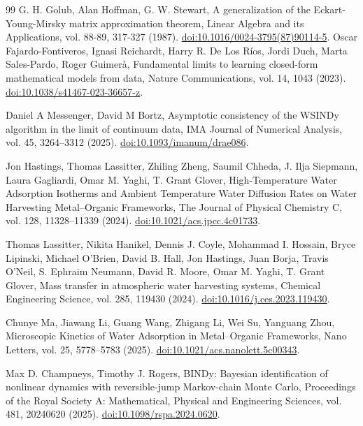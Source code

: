 \documentclass[11pt]{article}
\begin{document}
\begin{thebibliography}{99}
 G. H. Golub, Alan Hoffman, G. W. Stewart, A generalization of the Eckart-Young-Mirsky matrix approximation theorem, Linear Algebra and its Applications, vol. 88-89, 317-327 (1987). \href{https://doi.org/10.1016/0024-3795(87)90114-5}{doi:10.1016/0024-3795(87)90114-5}.
 Oscar Fajardo-Fontiveros, Ignasi Reichardt, Harry R. De Los R\'{i}os, Jordi Duch, Marta Sales-Pardo, Roger Guimer\`{a}, Fundamental limits to learning closed-form mathematical models from data, Nature Communications, vol. 14, 1043 (2023). \href{https://doi.org/10.1038/s41467-023-36657-z}{doi:10.1038/s41467-023-36657-z}.

 Daniel A Messenger, David M Bortz, Asymptotic consistency of the WSINDy algorithm in the limit of continuum data, IMA Journal of Numerical Analysis, vol. 45, 3264--3312 (2025). \href{https://doi.org/10.1093/imanum/drae086}{doi:10.1093/imanum/drae086}.

 Jon Hastings, Thomas Lassitter, Zhiling Zheng, Saumil Chheda, J. Ilja Siepmann, Laura Gagliardi, Omar M. Yaghi, T. Grant Glover, High-Temperature Water Adsorption Isotherms and Ambient Temperature Water Diffusion Rates on Water Harvesting Metal--Organic Frameworks, The Journal of Physical Chemistry C, vol. 128, 11328--11339 (2024). \href{https://doi.org/10.1021/acs.jpcc.4c01733}{doi:10.1021/acs.jpcc.4c01733}.

 Thomas Lassitter, Nikita Hanikel, Dennis J. Coyle, Mohammad I. Hossain, Bryce Lipinski, Michael O'Brien, David B. Hall, Jon Hastings, Juan Borja, Travis O'Neil, S. Ephraim Neumann, David R. Moore, Omar M. Yaghi, T. Grant Glover, Mass transfer in atmospheric water harvesting systems, Chemical Engineering Science, vol. 285, 119430 (2024). \href{https://doi.org/10.1016/j.ces.2023.119430}{doi:10.1016/j.ces.2023.119430}.

 Chunye Ma, Jiawang Li, Guang Wang, Zhigang Li, Wei Su, Yanguang Zhou, Microscopic Kinetics of Water Adsorption in Metal--Organic Frameworks, Nano Letters, vol. 25, 5778--5783 (2025). \href{https://doi.org/10.1021/acs.nanolett.5c00343}{doi:10.1021/acs.nanolett.5c00343}.

 Max D. Champneys, Timothy J. Rogers, BINDy: Bayesian identification of nonlinear dynamics with reversible-jump Markov-chain Monte Carlo, Proceedings of the Royal Society A: Mathematical, Physical and Engineering Sciences, vol. 481, 20240620 (2025). \href{https://doi.org/10.1098/rspa.2024.0620}{doi:10.1098/rspa.2024.0620}.


\end{thebibliography}
\end{document}
